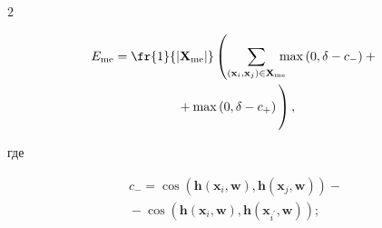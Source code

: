 \begin{multicols}{2}
\noindent


\begin{multline}


\label{eq:me}


E_{\mathrm{me}} = \fr{1}{|\mathbf{X}_{\mathrm{me}}|}\left( \sum\limits_{(\mathbf{x}_i, 


\mathbf{x}_j) \in \mathbf{X}_{\mathrm{me}}}\!\!\!\!\max \left(0, \delta - c_{-}\right) +{}\right.\\


\left.{}+ \max\left(0, \delta 


- c_{+}\right) 


\vphantom{\sum\limits_{(\mathbf{x}_i, 


\mathbf{x}_j) \in \mathbf{X}_{\mathrm{me}}}}


\right),


\end{multline}





\vspace*{-6pt}








\noindent


где 





\vspace*{-6pt}





\noindent


\begin{multline*}


c_{-} = \cos\left(\mathbf{h}\left(\mathbf{x}_i, \mathbf{w}\right), 


\mathbf{h}\left(\mathbf{x}_j, \mathbf{w}\right)\right) -{}\\


{}- \cos\left(\mathbf{h}\left(\mathbf{x}_i, 


\mathbf{w}\right), \mathbf{h}\left(\mathbf{x}_{i^{'}}, \mathbf{w}\right)\right);


\end{multline*}





\vspace*{-12pt}






\end{multicols}
